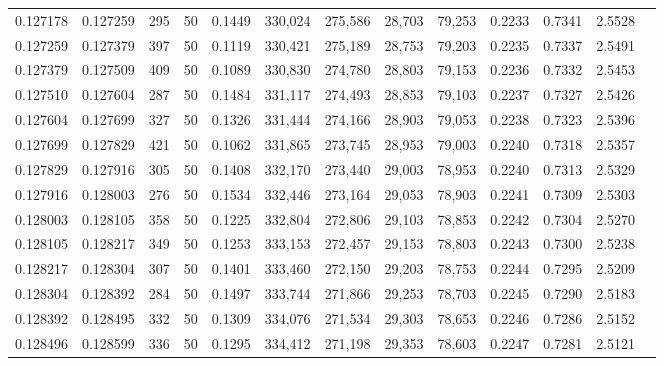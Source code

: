 \begin{tabular}{rrrrrrrrrrrrr}
0.127178 & 0.127259 &   295 &  50 &                                     0.1449 & 330,024 & 275,586 &  28,703 &  79,253 & 0.2233 & 0.7341 & 2.5528 \\
0.127259 & 0.127379 &   397 &  50 &                                     0.1119 & 330,421 & 275,189 &  28,753 &  79,203 & 0.2235 & 0.7337 & 2.5491 \\
0.127379 & 0.127509 &   409 &  50 &                                     0.1089 & 330,830 & 274,780 &  28,803 &  79,153 & 0.2236 & 0.7332 & 2.5453 \\
0.127510 & 0.127604 &   287 &  50 &                                     0.1484 & 331,117 & 274,493 &  28,853 &  79,103 & 0.2237 & 0.7327 & 2.5426 \\
0.127604 & 0.127699 &   327 &  50 &                                     0.1326 & 331,444 & 274,166 &  28,903 &  79,053 & 0.2238 & 0.7323 & 2.5396 \\
0.127699 & 0.127829 &   421 &  50 &                                     0.1062 & 331,865 & 273,745 &  28,953 &  79,003 & 0.2240 & 0.7318 & 2.5357 \\
0.127829 & 0.127916 &   305 &  50 &                                     0.1408 & 332,170 & 273,440 &  29,003 &  78,953 & 0.2240 & 0.7313 & 2.5329 \\
0.127916 & 0.128003 &   276 &  50 &                                     0.1534 & 332,446 & 273,164 &  29,053 &  78,903 & 0.2241 & 0.7309 & 2.5303 \\
0.128003 & 0.128105 &   358 &  50 &                                     0.1225 & 332,804 & 272,806 &  29,103 &  78,853 & 0.2242 & 0.7304 & 2.5270 \\
0.128105 & 0.128217 &   349 &  50 &                                     0.1253 & 333,153 & 272,457 &  29,153 &  78,803 & 0.2243 & 0.7300 & 2.5238 \\
0.128217 & 0.128304 &   307 &  50 &                                     0.1401 & 333,460 & 272,150 &  29,203 &  78,753 & 0.2244 & 0.7295 & 2.5209 \\
0.128304 & 0.128392 &   284 &  50 &                                     0.1497 & 333,744 & 271,866 &  29,253 &  78,703 & 0.2245 & 0.7290 & 2.5183 \\
0.128392 & 0.128495 &   332 &  50 &                                     0.1309 & 334,076 & 271,534 &  29,303 &  78,653 & 0.2246 & 0.7286 & 2.5152 \\
0.128496 & 0.128599 &   336 &  50 &                                     0.1295 & 334,412 & 271,198 &  29,353 &  78,603 & 0.2247 & 0.7281 & 2.5121 \\

\end{tabular}
